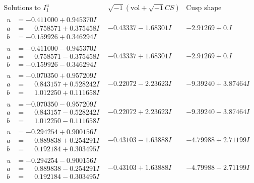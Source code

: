 \documentclass[1p]{elsarticle_modified}
\theoremstyle{definition}
\newcommand{\I}{\sqrt{-1}}
\begin{document}
$$\begin{array}{c|c|c}  
\text{Solutions to }I^u_{1}& \I (\text{vol} + \sqrt{-1}CS) & \text{Cusp shape}\\
 \hline 
\begin{aligned}
u &= -0.411000 + 0.945370 I \\
a &= \phantom{-}0.758571 + 0.375458 I \\
b &= -0.159926 + 0.346294 I\end{aligned}
 & -0.43337 - 1.68301 I & -2.91269 + 0. I\phantom{ +0.000000I} \\ \hline\begin{aligned}
u &= -0.411000 - 0.945370 I \\
a &= \phantom{-}0.758571 - 0.375458 I \\
b &= -0.159926 - 0.346294 I\end{aligned}
 & -0.43337 + 1.68301 I & -2.91269 + 0. I\phantom{ +0.000000I} \\ \hline\begin{aligned}
u &= -0.070350 + 0.957209 I \\
a &= \phantom{-}0.843157 + 0.528242 I \\
b &= \phantom{-}1.012250 + 0.111658 I\end{aligned}
 & -0.22072 - 2.23623 I & -9.39240 + 3.87464 I \\ \hline\begin{aligned}
u &= -0.070350 - 0.957209 I \\
a &= \phantom{-}0.843157 - 0.528242 I \\
b &= \phantom{-}1.012250 - 0.111658 I\end{aligned}
 & -0.22072 + 2.23623 I & -9.39240 - 3.87464 I \\ \hline\begin{aligned}
u &= -0.294254 + 0.900156 I \\
a &= \phantom{-}0.889838 + 0.254291 I \\
b &= \phantom{-}0.192184 + 0.303495 I\end{aligned}
 & -0.43103 - 1.63888 I & -4.79988 + 2.71199 I \\ \hline\begin{aligned}
u &= -0.294254 - 0.900156 I \\
a &= \phantom{-}0.889838 - 0.254291 I \\
b &= \phantom{-}0.192184 - 0.303495 I\end{aligned}
 & -0.43103 + 1.63888 I & -4.79988 - 2.71199 I \\ \hline\begin{aligned}

\end{aligned}
\end{array}$$
\end{document}
